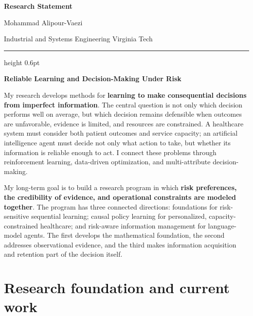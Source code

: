 \documentclass[11pt,letterpaper]{article}
\begin{document}
\color{Body}
\thispagestyle{firstpage}

{\LARGE\bfseries Research Statement}
\par
\vspace{3pt}

{\large Mohammad Alipour-Vaezi}
\par

{\small\color{Muted}
Industrial and Systems Engineering \textbar{} Virginia Tech}
\par
\vspace{5pt}

{\color{Accent}\hrule height 0.6pt}
\vspace{6pt}

{\large\bfseries
Reliable Learning and Decision-Making Under Risk}
\par

My research develops methods for \textbf{learning to make consequential
decisions from imperfect information}. The central question is not only
which decision performs well on average, but which decision remains
defensible when outcomes are unfavorable, evidence is limited, and
resources are constrained. A healthcare system must consider both patient
outcomes and service capacity; an artificial intelligence agent must
decide not only what action to take, but whether its information is
reliable enough to act. I connect these problems through reinforcement
learning, data-driven optimization, and multi-attribute decision-making.

My long-term goal is to build a research program in which \textbf{risk
preferences, the credibility of evidence, and operational constraints
are modeled together}. The program has three connected directions:
foundations for risk-sensitive sequential learning; causal policy learning
for personalized, capacity-constrained healthcare; and risk-aware
information management for language-model agents. The first develops the
mathematical foundation, the second addresses observational evidence, and
the third makes information acquisition and retention part of the decision
itself.

\section{Research foundation and current work}
\end{document}
